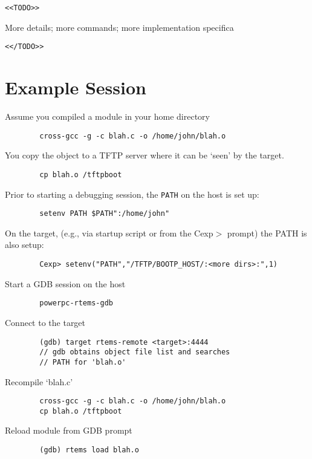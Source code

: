 \documentclass{article}
\begin{document}
\verb|<<TODO>>|

	More details; more commands; more implementation specifica

\verb|<</TODO>>|
	

\section{Example Session}
	Assume you compiled a module in your home directory
\begin{verbatim}
		cross-gcc -g -c blah.c -o /home/john/blah.o
\end{verbatim}
    You copy the object to a TFTP server where it can be
	`seen' by the target.
\begin{verbatim}
		cp blah.o /tftpboot
\end{verbatim}
	Prior to starting a debugging session, the {\tt PATH} on the
	host is set up:
\begin{verbatim}
		setenv PATH $PATH":/home/john"
\end{verbatim}
	On the target, (e.g., via startup script or from the Cexp$>$
	prompt) the PATH is also setup:
\begin{verbatim}
		Cexp> setenv("PATH","/TFTP/BOOTP_HOST/:<more dirs>:",1)
\end{verbatim}
	Start a GDB session on the host
\begin{verbatim}
		powerpc-rtems-gdb
\end{verbatim}
	Connect to the target
\begin{verbatim}
		(gdb) target rtems-remote <target>:4444
		// gdb obtains object file list and searches
        // PATH for 'blah.o'
\end{verbatim}
	Recompile `blah.c'
\begin{verbatim}
		cross-gcc -g -c blah.c -o /home/john/blah.o
		cp blah.o /tftpboot
\end{verbatim}
	Reload module from GDB prompt
\begin{verbatim}
		(gdb) rtems load blah.o
\end{verbatim}
\end{document}
